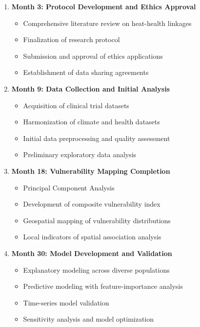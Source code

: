 \documentclass[12pt,a4paper,landscape]{article}
\begin{document}
\begin{enumerate}[leftmargin=*, itemsep=0.5em]
    \item \textbf{Month 3: Protocol Development and Ethics Approval}
    \begin{itemize}[leftmargin=*]
        \item Comprehensive literature review on heat-health linkages
        \item Finalization of research protocol
        \item Submission and approval of ethics applications
        \item Establishment of data sharing agreements
    \end{itemize}
    
    \item \textbf{Month 9: Data Collection and Initial Analysis}
    \begin{itemize}[leftmargin=*]
        \item Acquisition of clinical trial datasets
        \item Harmonization of climate and health datasets
        \item Initial data preprocessing and quality assessment
        \item Preliminary exploratory data analysis
    \end{itemize}
    
    \item \textbf{Month 18: Vulnerability Mapping Completion}
    \begin{itemize}[leftmargin=*]
        \item Principal Component Analysis
        \item Development of composite vulnerability index
        \item Geospatial mapping of vulnerability distributions
        \item Local indicators of spatial association analysis
    \end{itemize}
    
    \item \textbf{Month 30: Model Development and Validation}
    \begin{itemize}[leftmargin=*]
        \item Explanatory modeling across diverse populations
        \item Predictive modeling with feature-importance analysis
        \item Time-series model validation
        \item Sensitivity analysis and model optimization
    \end{itemize}
    

\end{enumerate}
\end{document}

